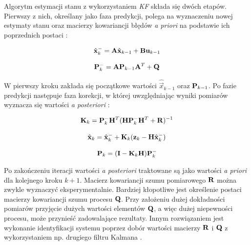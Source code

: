 Algorytm estymacji stanu z wykorzystaniem \textit{KF} składa się dwóch etapów. Pierwszy z nich, określany jako faza predykcji, polega na wyznaczeniu nowej estymaty stanu oraz macierzy kowariancji błędów \textit{a priori} na podstawie ich poprzednich postaci \cite{Welch1995}:

\begin{equation}
\label{equ:Filtr_Kalmana_faza_predykcji_stan}
	\hat{\mathbf{x}}_k^- = \mathbf{A} \hat{\mathbf{x}}_{k-1} + \mathbf{B} \mathbf{u}_{k - 1}
\end{equation}

\begin{equation}
\label{equ:Filtr_Kalmana_faza_predykcji_macierz_kowariancji_bledow}
	\mathbf{P}_k^- = \mathbf{A} \mathbf{P}_{k-1} \mathbf{A}^T + \mathbf{Q}
\end{equation}

W pierwszy kroku zakłada się początkowe wartości $\hat{\vec{x}}_{k-1}$ oraz $\mathbf{P}_{k-1}$. Po fazie predykcji następuje faza korekcji, w której uwzględniając wyniki pomiarów wyznacza się wartości \textit{a posteriori} \cite{Welch1995}:

\begin{equation}
\label{equ:Filtr_Kalmana_faza_korekcji_wzmocnienie}
	\mathbf{K}_k = \mathbf{P}_k^- \mathbf{H}^T ( \mathbf{H} \mathbf{P}_k^- \mathbf{H}^T +\mathbf{R} ) ^ {-1}
\end{equation}

\begin{equation}
\label{equ:Filtr_Kalmana_faza_korekcji_stan}
	\hat{\mathbf{x}}_k = \hat{\mathbf{x}}_k^- + \mathbf{K}_k(\mathbf{z}_k - \mathbf{H}\hat{\mathbf{x}}_k^-)
\end{equation}

\begin{equation}
\label{equ:Filtr_Kalmana_faza_korekcji_macierz_kowariancji_bledow}
	\mathbf{P}_k = (\mathbf{I} - \mathbf{K}_k \mathbf{H}) \mathbf{P}_k^-
\end{equation}

Po zakończeniu iteracji wartości \textit{a posteriori} traktowane są jako wartości \textit{a priori} dla kolejnego kroku $k+1$. Macierz kowariancji szumu pomiarowego $\mathbf{R}$ można zwykle wyznaczyć eksperymentalnie. Bardziej kłopotliwe jest określenie postaci macierzy kowariancji szumu procesu $\mathbf{Q}$. Przy założeniu dużej dokładności pomiarów przyjęcie dużych wartości elementów $\mathbf{Q}$, a więc dużej niepewności procesu, może przynieść zadowalające rezultaty. Innym rozwiązaniem jest wykonanie identyfikacji systemu poprzez dobór wartości macierzy $\mathbf{R}$ i $\mathbf{Q}$ z wykorzystaniem np. drugiego filtru Kalmana \cite{Welch1995}.

